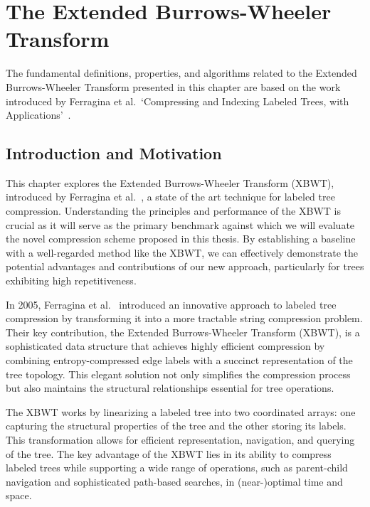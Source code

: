 \section[The Extended Burrows-Wheeler Transform]{The Extended Burrows-Wheeler \\ Transform} \label{chp:tree_compression}
The fundamental definitions, properties, and algorithms related to the Extended Burrows-Wheeler Transform presented in this chapter are based on the work introduced by Ferragina et al.~`Compressing and Indexing Labeled Trees, with Applications'~\cite{ferragina2009compressing}.

\subsection{Introduction and Motivation}
This chapter explores the Extended Burrows-Wheeler Transform (XBWT), introduced by Ferragina et al.~\cite{ferragina2009compressing}, a state of the art technique for labeled tree compression. Understanding the principles and performance of the XBWT is crucial as it will serve as the primary benchmark against which we will evaluate the novel compression scheme proposed in this thesis. By establishing a baseline with a well-regarded method like the XBWT, we can effectively demonstrate the potential advantages and contributions of our new approach, particularly for trees exhibiting high repetitiveness.

In 2005, Ferragina et al.~\cite{ferragina2009compressing} introduced an innovative approach to labeled tree compression by transforming it into a more tractable string compression problem. Their key contribution, the Extended Burrows-Wheeler Transform (XBWT), is a sophisticated data structure that achieves highly efficient compression by combining entropy-compressed edge labels with a succinct representation of the tree topology. This elegant solution not only simplifies the compression process but also maintains the structural relationships essential for tree operations.

The XBWT works by linearizing a labeled tree into two coordinated arrays: one capturing the structural properties of the tree and the other storing its labels. This transformation allows for efficient representation, navigation, and querying of the tree. The key advantage of the XBWT lies in its ability to compress labeled trees while supporting a wide range of operations, such as parent-child navigation and sophisticated path-based searches, in (near-)optimal time and space.

